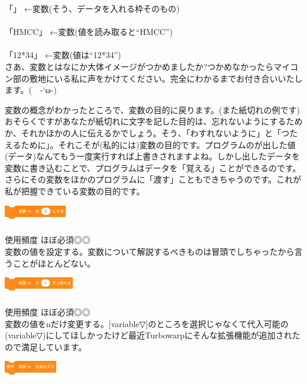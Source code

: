 \documentclass[b5paper,10pt]{jsarticle}
\begin{document}
\begin{multicols*}{3}
「」 ←変数(そう、データを入れる枠そのもの)\\
\\
「HMCC」 ←変数(値を読み取ると``HMCC'')\\
\\
「12*34」 ←変数(値は``12*34'')\\

さあ、変数とはなにか大体イメージがつかめましたか?つかめなかったらマイコン部の敷地にいる私に声をかけてください。完全にわかるまでお付き合いいたします。(　-`ω-)

変数の概念がわかったところで、変数の目的に戻ります。(また紙切れの例です)おそらくですがあなたが紙切れに文字を記した目的は、忘れないようにするためか、それかほかの人に伝えるかでしょう。そう、「わすれないように」と「つたえるために」。それこそが(私的には)変数の目的です。プログラムのが出した値(データ)なんてもう一度実行すれば上書きされますよね。しかし出したデータを変数に書き込むことで、プログラムはデータを「覚える」ことができるのです。さらにその変数をほかのプログラムに「渡す」こともできちゃうのです。これが私が把握できている変数の目的です。
\begin{itembox}{1}
\includegraphics[height=8mm]{images/variables_1.png}
\end{itembox}
使用頻度 ほぼ必須◎◎\\
変数の値を設定する。変数について解説するべきものは冒頭でしちゃったから言うことがほとんどない。
\begin{itembox}{2}
\includegraphics[height=8mm]{images/variables_2.png}
\end{itembox}
使用頻度 ほぼ必須◎◎\\
変数の値をnだけ変更する。[variable▽]のところを選択じゃなくて代入可能の(variable▽)にしてほしかったけど最近Turbowarpにそんな拡張機能が追加されたので満足しています。
\begin{itembox}{3}
\includegraphics[height=8mm]{images/variables_3.png}


\end{itembox}
\end{multicols*}
\end{document}
